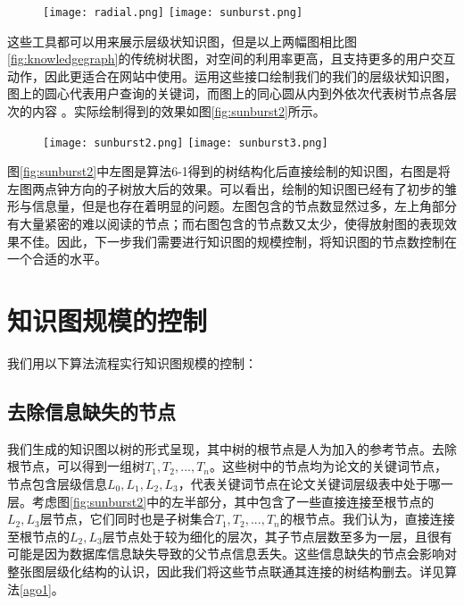 \begin{figure}[!htp]
  \centering
  \texttt{[image: radial.png]}
  \hspace{1cm}
  \texttt{[image: sunburst.png]}
\end{figure}

这些工具都可以用来展示层级状知识图，但是以上两幅图相比图\ref{fig:knowledgegraph}的传统树状图，对空间的利用率更高，且支持更多的用户交互动作，因此更适合在网站中使用。运用这些接口绘制我们的我们的层级状知识图，图上的圆心代表用户查询的关键词，而图上的同心圆从内到外依次代表树节点各层次的内容 。实际绘制得到的效果如图\ref{fig:sunburst2}所示。

\begin{figure}[!htp]
  \centering
  \texttt{[image: sunburst2.png]}
  \hspace{1cm}
  \texttt{[image: sunburst3.png]}
\end{figure}

图\ref{fig:sunburst2}中左图是算法6-1得到的树结构化后直接绘制的知识图，右图是将左图两点钟方向的子树放大后的效果。可以看出，绘制的知识图已经有了初步的雏形与信息量，但是也存在着明显的问题。左图包含的节点数显然过多，左上角部分有大量紧密的难以阅读的节点；而右图包含的节点数又太少，使得放射图的表现效果不佳。因此，下一步我们需要进行知识图的规模控制，将知识图的节点数控制在一个合适的水平。

\section{知识图规模的控制}
我们用以下算法流程实行知识图规模的控制：
\subsection{去除信息缺失的节点}
我们生成的知识图以树的形式呈现，其中树的根节点是人为加入的参考节点。去除根节点，可以得到一组树${T_1,T_2,...,T_n}$。这些树中的节点均为论文的关键词节点，节点包含层级信息${L_0,L_1,L_2,L_3}$，代表关键词节点在论文关键词层级表中处于哪一层。考虑图\ref{fig:sunburst2}中的左半部分，其中包含了一些直接连接至根节点的$L_2,L_3$层节点，它们同时也是子树集合${T_1,T_2,...,T_n}$的根节点。我们认为，直接连接至根节点的$L_2,L_3$层节点处于较为细化的层次，其子节点层数至多为一层，且很有可能是因为数据库信息缺失导致的父节点信息丢失。这些信息缺失的节点会影响对整张图层级化结构的认识，因此我们将这些节点联通其连接的树结构删去。详见算法\ref{ago1}。

